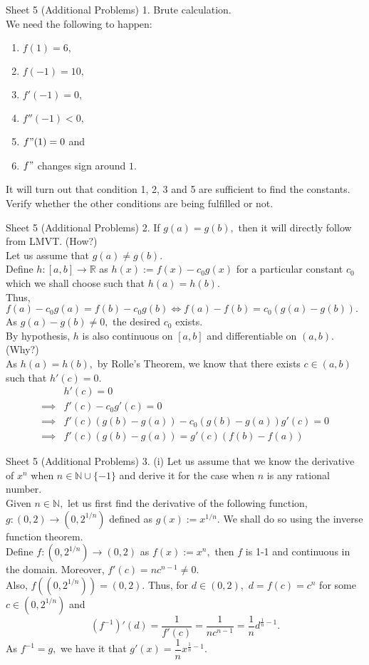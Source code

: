 \documentclass[handout, aspectratio=169]{beamer}
\begin{document}
\begin{frame}{Sheet 5 (Additional Problems)}
	1. Brute calculation.\\
	We need the following to happen:\\
	\begin{enumerate} 
		\item $f(1) = 6,$
		\item $f(-1) = 10,$
		\item $f'(-1) = 0,$
		\item $f''(-1) < 0,$
		\item $f"(1) = 0$ and
		\item $f"$ changes sign around $1.$
	\end{enumerate}
	It will turn out that condition 1, 2, 3 and 5 are sufficient to find the constants. Verify whether the other conditions are being fulfilled or not.
\end{frame}
\begin{frame}{Sheet 5 (Additional Problems)}
	2. If $g(a) = g(b),$ then it will directly follow from LMVT. (How?)\\
	Let us assume that $g(a) \neq g(b).$\\
	Define $h:[a, b] \to \mathbb{R}$ as $h(x) := f(x) - c_0g(x)$ for a particular constant $c_0$ which we shall choose such that $h(a) = h(b).$\\
	Thus, $f(a) - c_0g(a) = f(b) - c_0g(b) \iff f(a) - f(b) = c_0(g(a) - g(b)).$ As $g(a) - g(b) \neq 0,$ the desired $c_0$ exists.\\
	By hypothesis, $h$ is also continuous on $[a, b]$ and differentiable on $(a, b).$ (Why?)\\
	As $h(a) = h(b),$ by Rolle's Theorem, we know that there exists $c \in (a, b)$ such that $h'(c) = 0.$\\
	\begin{align*}
		&h'(c) = 0\\
		\implies& f'(c) - c_0g'(c) = 0\\
		\implies& f'(c)(g(b) - g(a)) - c_0(g(b) - g(a))g'(c) = 0\\
		\implies& f'(c)(g(b) - g(a)) = g'(c)(f(b) - f(a))
	\end{align*}
\end{frame}
\begin{frame}{Sheet 5 (Additional Problems)}
	3. (i) Let us assume that we know the derivative of $x^n$ when $n \in \mathbb{N} \cup \{-1\}$ and derive it for the case when $n$ is any rational number. \\
	Given $n \in \mathbb{N},$ let us first find the derivative of the following function, $g:(0, 2) \to (0, 2^{1/n})$ defined as $g(x) := x^{1/n}.$ We shall do so using the inverse function theorem.\\
	Define $f:(0, 2^{1/n}) \to (0, 2)$ as $f(x) := x^n,$ then $f$ is 1-1 and continuous in the domain. Moreover, $f'(c) = nc^{n-1} \neq 0.$\\
	Also, $f\left((0,2^{1/n})\right) = (0, 2).$	Thus, for $d \in (0, 2),$ $d = f(c) = c^n$ for some $c \in (0, 2^{1/n})$ and
	\[(f^{-1})'(d) = \dfrac{1}{f'(c)} = \dfrac{1}{nc^{n-1}} = \dfrac{1}{n}d^{\frac{1}{n} - 1}.\]
	As $f^{-1} = g,$ we have it that $g'(x) = \dfrac{1}{n}x^{\frac{1}{n} - 1}.$
\end{frame}
\end{document}
